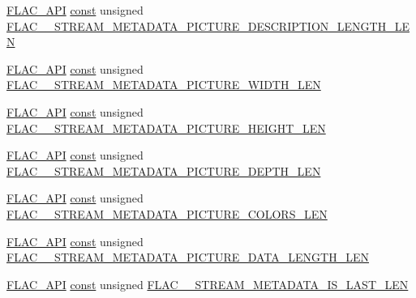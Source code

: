 \begin{DoxyCompactItemize}
\hyperlink{group__flac__export_ga56ca07df8a23310707732b1c0007d6f5}{F\+L\+A\+C\+\_\+\+A\+PI} \hyperlink{getopt1_8c_a2c212835823e3c54a8ab6d95c652660e}{const} unsigned \hyperlink{group__flac__format_gab3a293664bc479d1a1367631d7b776f7}{F\+L\+A\+C\+\_\+\+\_\+\+S\+T\+R\+E\+A\+M\+\_\+\+M\+E\+T\+A\+D\+A\+T\+A\+\_\+\+P\+I\+C\+T\+U\+R\+E\+\_\+\+D\+E\+S\+C\+R\+I\+P\+T\+I\+O\+N\+\_\+\+L\+E\+N\+G\+T\+H\+\_\+\+L\+EN}
\item 
\hyperlink{group__flac__export_ga56ca07df8a23310707732b1c0007d6f5}{F\+L\+A\+C\+\_\+\+A\+PI} \hyperlink{getopt1_8c_a2c212835823e3c54a8ab6d95c652660e}{const} unsigned \hyperlink{group__flac__format_ga4e7491ae179e5c713e2246ac80cf36e6}{F\+L\+A\+C\+\_\+\+\_\+\+S\+T\+R\+E\+A\+M\+\_\+\+M\+E\+T\+A\+D\+A\+T\+A\+\_\+\+P\+I\+C\+T\+U\+R\+E\+\_\+\+W\+I\+D\+T\+H\+\_\+\+L\+EN}
\item 
\hyperlink{group__flac__export_ga56ca07df8a23310707732b1c0007d6f5}{F\+L\+A\+C\+\_\+\+A\+PI} \hyperlink{getopt1_8c_a2c212835823e3c54a8ab6d95c652660e}{const} unsigned \hyperlink{group__flac__format_gab072f764d249b491b42514c8a1d18d22}{F\+L\+A\+C\+\_\+\+\_\+\+S\+T\+R\+E\+A\+M\+\_\+\+M\+E\+T\+A\+D\+A\+T\+A\+\_\+\+P\+I\+C\+T\+U\+R\+E\+\_\+\+H\+E\+I\+G\+H\+T\+\_\+\+L\+EN}
\item 
\hyperlink{group__flac__export_ga56ca07df8a23310707732b1c0007d6f5}{F\+L\+A\+C\+\_\+\+A\+PI} \hyperlink{getopt1_8c_a2c212835823e3c54a8ab6d95c652660e}{const} unsigned \hyperlink{group__flac__format_gaf353f5e8c2a50d00e77f31b97fda078e}{F\+L\+A\+C\+\_\+\+\_\+\+S\+T\+R\+E\+A\+M\+\_\+\+M\+E\+T\+A\+D\+A\+T\+A\+\_\+\+P\+I\+C\+T\+U\+R\+E\+\_\+\+D\+E\+P\+T\+H\+\_\+\+L\+EN}
\item 
\hyperlink{group__flac__export_ga56ca07df8a23310707732b1c0007d6f5}{F\+L\+A\+C\+\_\+\+A\+PI} \hyperlink{getopt1_8c_a2c212835823e3c54a8ab6d95c652660e}{const} unsigned \hyperlink{group__flac__format_ga3eb701d8a4cfab5c6b6e778a7a15cc95}{F\+L\+A\+C\+\_\+\+\_\+\+S\+T\+R\+E\+A\+M\+\_\+\+M\+E\+T\+A\+D\+A\+T\+A\+\_\+\+P\+I\+C\+T\+U\+R\+E\+\_\+\+C\+O\+L\+O\+R\+S\+\_\+\+L\+EN}
\item 
\hyperlink{group__flac__export_ga56ca07df8a23310707732b1c0007d6f5}{F\+L\+A\+C\+\_\+\+A\+PI} \hyperlink{getopt1_8c_a2c212835823e3c54a8ab6d95c652660e}{const} unsigned \hyperlink{group__flac__format_ga30354d7318c03c9b272554eeb7d28719}{F\+L\+A\+C\+\_\+\+\_\+\+S\+T\+R\+E\+A\+M\+\_\+\+M\+E\+T\+A\+D\+A\+T\+A\+\_\+\+P\+I\+C\+T\+U\+R\+E\+\_\+\+D\+A\+T\+A\+\_\+\+L\+E\+N\+G\+T\+H\+\_\+\+L\+EN}
\item 
\hyperlink{group__flac__export_ga56ca07df8a23310707732b1c0007d6f5}{F\+L\+A\+C\+\_\+\+A\+PI} \hyperlink{getopt1_8c_a2c212835823e3c54a8ab6d95c652660e}{const} unsigned \hyperlink{group__flac__format_ga52249514c52427990483b9f5a0ca7f93}{F\+L\+A\+C\+\_\+\+\_\+\+S\+T\+R\+E\+A\+M\+\_\+\+M\+E\+T\+A\+D\+A\+T\+A\+\_\+\+I\+S\+\_\+\+L\+A\+S\+T\+\_\+\+L\+EN}

\end{DoxyCompactItemize}
